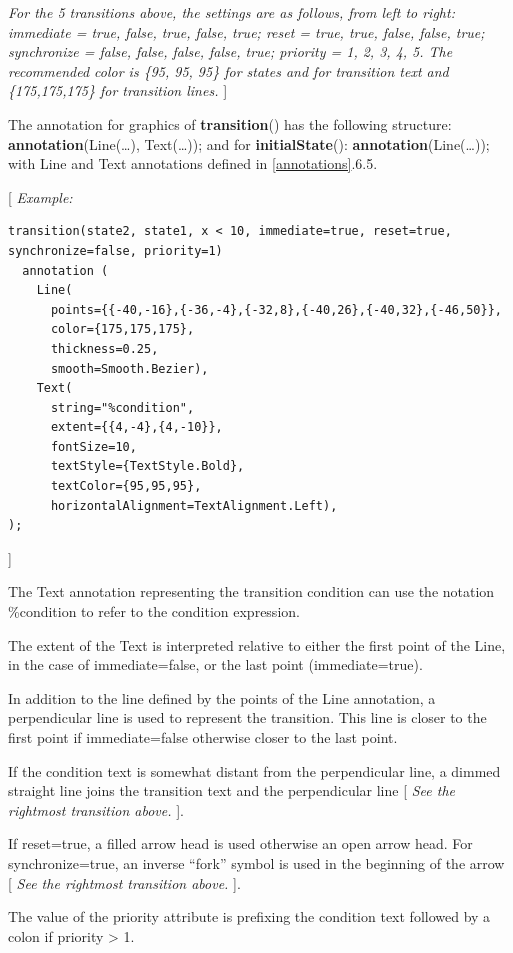 \documentclass[10pt,a4paper]{report}
\begin{document}
\emph{For
the 5 transitions above, the settings are as follows, from left to
right: immediate = true, false, true, false, true; reset = true, true,
false, false, true; synchronize = false, false, false, false, true;
priority = 1, 2, 3, 4, 5. The recommended color is \{95, 95, 95\} for
states and for transition text and \{175,175,175\} for transition
lines.} {]}

The annotation for graphics of \textbf{transition}() has the following
structure: \textbf{annotation}(Line(\ldots{}), Text(\ldots{})); and for
\textbf{initialState}(): \textbf{annotation}(Line(\ldots{})); with Line
and Text annotations defined in \ref{annotations}.6.5.

{[} \emph{Example:}
\begin{lstlisting}[language=modelica]
transition(state2, state1, x < 10, immediate=true, reset=true, synchronize=false, priority=1)
  annotation (
    Line(
      points={{-40,-16},{-36,-4},{-32,8},{-40,26},{-40,32},{-46,50}},
      color={175,175,175},
      thickness=0.25,
      smooth=Smooth.Bezier),
    Text(
      string="%condition",
      extent={{4,-4},{4,-10}},
      fontSize=10,
      textStyle={TextStyle.Bold},
      textColor={95,95,95},
      horizontalAlignment=TextAlignment.Left),
);
\end{lstlisting}
{]}

The Text annotation representing the transition condition can use the
notation \%condition to refer to the condition expression.

The extent of the Text is interpreted relative to either the first point
of the Line, in the case of immediate=false, or the last point
(immediate=true).

In addition to the line defined by the points of the Line annotation, a
perpendicular line is used to represent the transition. This line is
closer to the first point if immediate=false otherwise closer to the
last point.

If the condition text is somewhat distant from the perpendicular line, a
dimmed straight line joins the transition text and the perpendicular
line {[} \emph{See the rightmost transition above.} {]}.

If reset=true, a filled arrow head is used otherwise an open arrow head.
For synchronize=true, an inverse ``fork'' symbol is used in the
beginning of the arrow {[} \emph{See the rightmost transition above.}
{]}.

The value of the priority attribute is prefixing the condition text
followed by a colon if priority \textgreater{} 1.
\end{document}

